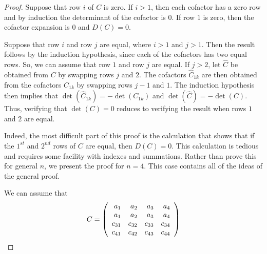 \documentclass{ximera}
\begin{document}
\begin{proof}
Suppose that row $i$ of $C$ is zero.  If $i>1$, then each cofactor has a 
zero row and by induction the determinant of the cofactor is $0$.  If row 
$1$ is zero, then the cofactor expansion is $0$ and $D(C)=0$. 

Suppose that row $i$ and row $j$ are equal, where $i >1$ and $j>1$.  Then the result
follows by the induction hypothesis, since each of the cofactors has two equal rows.  
So, we can assume that row $1$ and row $j$ are equal.  If $j>2$, let $\hat{C}$ be 
obtained from $C$ by swapping rows $j$ and $2$.  The cofactors $\hat{C}_{1k}$
are then obtained from the cofactors $C_{1k}$ by swapping rows $j-1$ and $1$.
The induction hypothesis then implies that $\det(\hat{C}_{1k})=-\det(C_{1k})$ and 
$\det(\hat{C}) = -\det(C)$.   Thus, verifying that $\det(C)=0$ reduces to verifying 
the result when rows $1$ and $2$ are equal.

Indeed, the most difficult part of this proof is the calculation that shows that if the 
$1^{st}$ and $2^{nd}$ rows of $C$ are equal, then $D(C)=0$.  This calculation is 
tedious and requires some facility with indexes and summations.  Rather than 
prove this for general $n$, we present the proof for $n=4$.  This case contains 
all of the ideas of the general proof.  

We can assume that 
\[
C = \left(\begin{array}{rrrrrrrrrrrrrrrrrr} a_1 & a_2 & a_3 & a_4 \\ a_1 & a_2 & a_3 & a_4 \\ 
c_{31} & c_{32} & c_{33} & c_{34} \\ c_{41} & c_{42} & c_{43} & c_{44} \end{array}\right)
\]



\end{proof}
\end{document}
